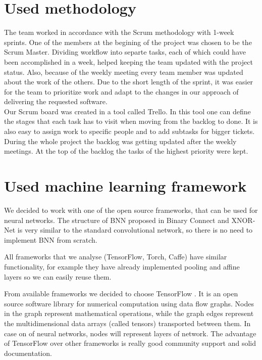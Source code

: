 \documentclass[licencjacka]{pracamgr}
\begin{document}
	\section{Used methodology}

	The team worked in accordance with the Scrum methodology with 1-week sprints. One of the members at the begining of the project was chosen to be the Scrum Master. Dividing workflow into separte tasks, each of which could have been accomplished in a week, helped keeping the team updated with the project status. Also, because of the weekly meeting every team member was updated about the work of the others. Due to the short length of the sprint, it was easier for the team to prioritize work and adapt to the changes in our approach of delivering the requested software.
\\
	Our Scrum board was created in a tool called Trello. In this tool one can define the stages that each task has to visit when moving from the backlog to done. It is also easy to assign work to specific people and to add subtasks for bigger tickets. During the whole project the backlog was getting updated after the weekly meetings. At the top of the backlog the tasks of the highest priority were kept.

	\section{Used machine learning framework}

		We decided to work with one of the open source frameworks, that can be used for neural networks. The structure of BNN proposed in Binary Connect \cite{binaryConnect} and XNOR-Net \cite{xnornet} is very similar to the standard convolutional network, so there is no need to implement BNN from scratch. 
	
		All frameworks that we analyse (TensorFlow, Torch, Caffe) have similar functionality, for example they have already implemented pooling and affine layers so we can easily reuse them. 

		From available frameworks we decided to choose TensorFlow \cite{tensorFlow}. It is an open source software library for numerical computation using data flow graphs. Nodes in the graph represent mathematical operations, while the graph edges represent the multidimensional data arrays (called tensors) transported between them. In case on of neural networks, nodes will represent layers of network. 
		The advantage of TensorFlow over other frameworks is really good community support and solid documentation.
\end{document}
